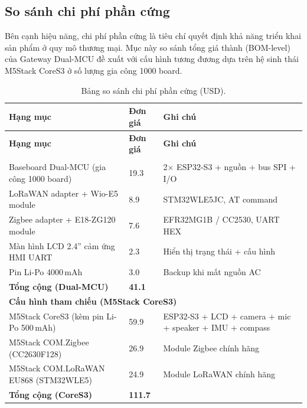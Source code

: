         \subsection{So sánh chi phí phần cứng}
        \label{subsec:cost_compare}
        
        Bên cạnh hiệu năng, chi phí phần cứng là tiêu chí quyết định khả năng triển khai sản phẩm ở quy mô thương mại. Mục này so sánh tổng giá thành (BOM-level) của Gateway Dual-MCU đề xuất với cấu hình tương đương dựa trên hệ sinh thái M5Stack CoreS3 ở số lượng gia công 1000 board.
        
        \begin{longtable}{|p{6cm}|p{2.5cm}|p{6cm}|}
            \caption{Bảng so sánh chi phí phần cứng (USD).} \label{tab:cost_compare} \\
            \hline
            \textbf{Hạng mục} & \textbf{Đơn giá} & \textbf{Ghi chú} \\ \hline
            \endfirsthead
            \hline
            \textbf{Hạng mục} & \textbf{Đơn giá} & \textbf{Ghi chú} \\ \hline
            \endhead
            \hline
            \endfoot
            \endlastfoot
            \multicolumn{3}{|l|}{\textbf{Sản phẩm đồ án (Dual-MCU)}} \\ \hline
            Baseboard Dual-MCU (gia công 1000 board) & 19{.}3 & 2$\times$ ESP32-S3 + nguồn + bus SPI + I/O \\ \hline
            LoRaWAN adapter + Wio-E5 module & 8{.}9 & STM32WLE5JC, AT command \\ \hline
            Zigbee adapter + E18-ZG120 module & 7{.}6 & EFR32MG1B / CC2530, UART HEX \\ \hline
            Màn hình LCD 2.4'' cảm ứng HMI UART & 2{.}3 & Hiển thị trạng thái + cấu hình \\ \hline
            Pin Li-Po 4000\,mAh & 3{.}0 & Backup khi mất nguồn AC \\ \hline
            \textbf{Tổng cộng (Dual-MCU)} & \textbf{41{.}1} & \\ \hline
            \multicolumn{3}{|l|}{\textbf{Cấu hình tham chiếu (M5Stack CoreS3)}} \\ \hline
            M5Stack CoreS3 (kèm pin Li-Po 500\,mAh) & 59{.}9 & ESP32-S3 + LCD + camera + mic + speaker + IMU + compass \\ \hline
            M5Stack COM.Zigbee (CC2630F128) & 26{.}9 & Module Zigbee chính hãng \\ \hline
            M5Stack COM.LoRaWAN EU868 (STM32WLE5) & 24{.}9 & Module LoRaWAN chính hãng \\ \hline
            \textbf{Tổng cộng (CoreS3)} & \textbf{111{.}7} & \\ \hline
        \end{longtable}
        
